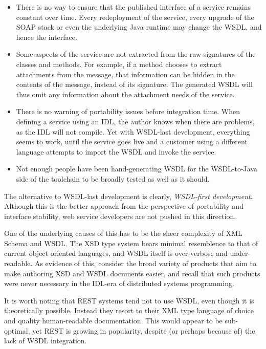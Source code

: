 \begin{itemize}

\item
    There is no way to ensure that the published interface of a service
    remains constant over time. Every redeployment of the service, every
    upgrade of the SOAP stack or even the underlying Java runtime may
    change the WSDL, and hence the interface.

\item

Some aspects of the service are not extracted from the raw signatures
of the classes and methods. For example, if a method chooses to extract
attachments from the message, that information can be hidden in the contents
of the message, instead of its signature. The generated WSDL will thus
omit any information about the attachment needs of the service.

\item

There is no warning of portability issues before integration time. 
When defining a service using an IDL, the author knows
when there are problems, as the IDL will not compile. Yet with WSDL-last
development, everything seems to work, until the service goes live and
a customer using a different language attempts to import the WSDL and
invoke the service.

\item

Not enough people have been hand-generating WSDL for the WSDL-to-Java
side of the toolchain to be broadly tested as well as it should.

    
\end{itemize}

The alternative to WSDL-last development is clearly, \emph{WSDL-first
development}. Although this is the better approach from the perspective
of portability and interface stability, web service developers are not
pushed in this direction.

One of the underlying causes of this has to be the sheer complexity of
XML Schema and WSDL. The XSD type system bears minimal resemblence to
that of current object oriented languages, and WSDL itself is
over-verbose and under-readable. As evidence of this, consider the
broad variety of products that aim to make authoring XSD and WSDL
documents easier, and recall that such products were never necessary
in the IDL-era of distributed systems programming.

It is worth noting that REST systems \cite{fielding:rest} tend not to
use WSDL, even though it is theoretically possible. Instead they
resort to their XML type language of choice and quality human-readable
documentation. This would appear to be sub-optimal, yet REST is
growing in popularity, despite (or perhaps because of) the lack of
WSDL integration.

